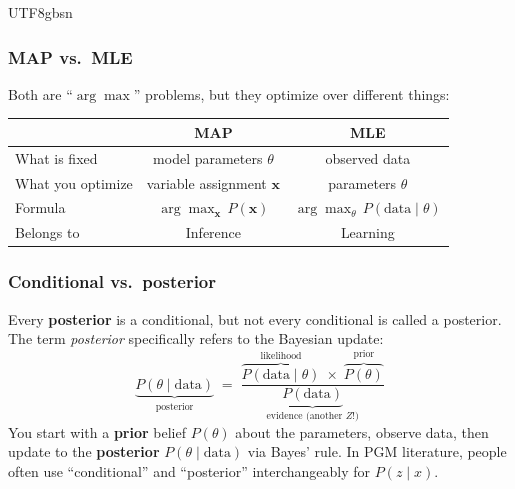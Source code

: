 \documentclass[11pt]{article}
\begin{document}
\begin{CJK}{UTF8}{gbsn}
\vspace{0.3em}
\noindent{}

\subsubsection*{MAP vs.\ MLE}

Both are ``$\arg\max$'' problems, but they optimize over different things:

\begin{center}
\begin{tabular}{l|cc}
  & \textbf{MAP} & \textbf{MLE} \\
  \hline
  What is fixed & model parameters $\theta$ & observed data \\
  What you optimize & variable assignment $\mathbf{x}$ & parameters $\theta$ \\
  Formula & $\arg\max_{\mathbf{x}}\, P(\mathbf{x})$ & $\arg\max_{\theta}\, P(\text{data} \mid \theta)$ \\
  Belongs to & Inference & Learning \\
\end{tabular}
\end{center}

\subsubsection*{Conditional vs.\ posterior}

Every \textbf{posterior} is a conditional, but not every conditional is called a posterior. The term \emph{posterior} specifically refers to the Bayesian update:
\[
  \underbrace{P(\theta \mid \text{data})}_{\text{posterior}}
  \;=\;
  \frac{
    \overbrace{P(\text{data} \mid \theta)}^{\text{likelihood}}
    \;\times\;
    \overbrace{P(\theta)}^{\text{prior}}
  }{
    \underbrace{P(\text{data})}_{\text{evidence (another }Z\text{!)}}
  }
\]
You start with a \textbf{prior} belief $P(\theta)$ about the parameters, observe data, then update to the \textbf{posterior} $P(\theta \mid \text{data})$ via Bayes' rule. In PGM literature, people often use ``conditional'' and ``posterior'' interchangeably for $P(z \mid x)$.


\end{CJK}
\end{document}
